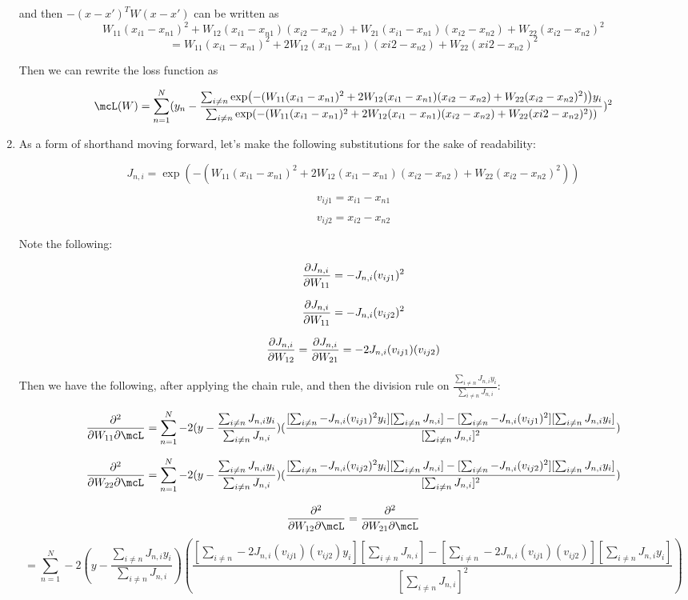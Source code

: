 \documentclass[submit]{harvardml}
\begin{document}
\begin{enumerate}
    and then $-(x-x')^T W (x-x')$ can be written as
    $$W_{11}(x_{i1} - x_{n1})^2 + W_{12}(x_{i1} - x_{n1})(x_{i2} - x_{n2}) +  W_{21}(x_{i1} - x_{n1})(x_{i2} - x_{n2}) + W_{22}(x_{i2} - x_{n2})^2$$
    $$= W_{11}(x_{i1} - x_{n1})^2 + 2W_{12}(x_{i1} - x_{n1})(x{i2} - x_{n2}) + W_{22}(x{i2} - x_{n2})^2$$

    Then we can rewrite the loss function as

    $$\mcL(W)=\sum_{n=1}^N (y_n - \frac{\sum_{i \neq n} \exp(-(W_{11}(x_{i1} - x_{n1})^2 + 2W_{12}(x_{i1} - x_{n1})(x_{i2} - x_{n2}) + W_{22}(x_{i2} - x_{n2})^2))y_i}{\sum_{i \neq n} \exp(-(W_{11}(x_{i1} - x_{n1})^2 + 2W_{12}(x_{i1} - x_{n1})(x_{i2} - x_{n2}) + W_{22}(x{i2} - x_{n2})^2))})^2$$

    \item As a form of shorthand moving forward, let's make the following substitutions for the sake of readability:

    $$J_{n,i} = \exp(-(W_{11}(x_{i1} - x_{n1})^2 + 2W_{12}(x_{i1} - x_{n1})(x_{i2} - x_{n2}) + W_{22}(x_{i2} - x_{n2})^2))$$

    $$v_{ij1} = x_{i1} - x_{n1}$$

    $$v_{ij2} = x_{i2} - x_{n2}$$

    Note the following:

    $$\pdv{J_{n,i}}{W_{11}} = -J_{n,i}(v_{ij1})^2$$

    $$\pdv{J_{n,i}}{W_{11}} = -J_{n,i}(v_{ij2})^2$$

    $$\pdv{J_{n,i}}{W_{12}} = \pdv{J_{n,i}}{W_{21}} = -2J_{n,i}(v_{ij1})(v_{ij2})$$

    Then we have the following, after applying the chain rule, and then the division rule on $\frac{\sum_{i \neq n} J_{n,i}y_i}{\sum_{i \neq n} J_{n,i}}$:

    $$\pdv{}{W_{11}}\mcL(W) = \sum_{n=1}^N -2(y-\frac{\sum_{i \neq n} J_{n,i}y_i}{\sum_{i \neq n} J_{n,i}})(\frac{[\sum_{i \neq n} -J_{n,i}(v_{ij1})^2y_i][\sum_{i \neq n} J_{n,i}] - [\sum_{i \neq n} -J_{n,i}(v_{ij1})^2][\sum_{i \neq n} J_{n,i}y_i ]}{[\sum_{i \neq n} J_{n,i}]^2})$$

    $$\pdv{}{W_{22}}\mcL(W) = \sum_{n=1}^N -2(y-\frac{\sum_{i \neq n} J_{n,i}y_i}{\sum_{i \neq n} J_{n,i}})(\frac{[\sum_{i \neq n} -J_{n,i}(v_{ij2})^2y_i][\sum_{i \neq n} J_{n,i}] - [\sum_{i \neq n} -J_{n,i}(v_{ij2})^2][\sum_{i \neq n} J_{n,i}y_i ]}{[\sum_{i \neq n} J_{n,i}]^2})$$

    $$\pdv{}{W_{12}}\mcL(W) = \pdv{}{W_{21}}\mcL(W) $$
    $$= \sum_{n=1}^N -2(y-\frac{\sum_{i \neq n} J_{n,i}y_i}{\sum_{i \neq n} J_{n,i}})(\frac{[\sum_{i \neq n} -2J_{n,i}(v_{ij1})(v_{ij2})y_i][\sum_{i \neq n} J_{n,i}] - [\sum_{i \neq n} -2J_{n,i}(v_{ij1})(v_{ij2})][\sum_{i \neq n} J_{n,i}y_i ]}{[\sum_{i \neq n} J_{n,i}]^2})$$


\end{enumerate}
\end{document}
